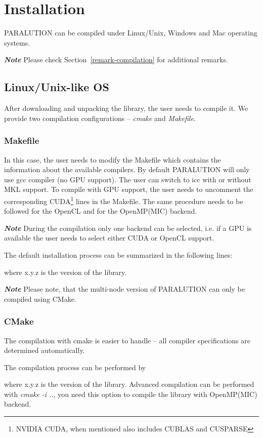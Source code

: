 \chapter{Installation}

PARALUTION can be compiled under Linux/Unix, Windows and Mac operating systems.

\textbf{\emph{Note}} Please check Section~\ref{remark-compilation} for additional remarks.

\section{Linux/Unix-like OS}
After downloading and unpacking the library, the user needs to compile it. We provide two compilation configurations -- \emph{cmake} and \emph{Makefile}.

\subsection{Makefile}
In this case, the user needs to modify the Makefile which contains the information about the available compilers. By default PARALUTION will only use gcc \cite{gcc} compiler (no GPU support). The user can switch to icc \cite{icc} with or without MKL \cite{mkl} support. To compile with GPU support, the user needs to uncomment the corresponding CUDA\footnote{NVIDIA CUDA, when mentioned  also includes CUBLAS and CUSPARSE} \cite{cuda} lines in the Makefile. The same procedure needs to be followed for the OpenCL \cite{opencl} and for the OpenMP(MIC) backend. 

\textbf{\emph{Note}} During the compilation only one backend can be selected, i.e. if a GPU is available the user needs to select either CUDA or OpenCL support. 

The default installation process can be summarized in the following lines:

where {x.y.z} is the version of the library. 

\textbf{\emph{Note}} Please note, that the multi-node version of PARALUTION can only be compiled using CMake.


\subsection{CMake}
The compilation with cmake \cite{cmake} is easier to handle -- all compiler specifications are determined automatically. 

The compilation process can be performed by

where {x.y.z} is the version of the library. Advanced compilation can be performed with \emph{cmake -i ..}, you need this option to compile the library with OpenMP(MIC) backend.

